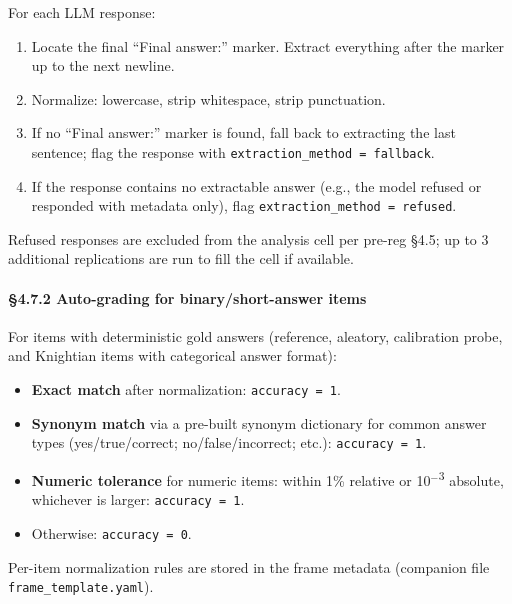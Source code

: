 \documentclass{article}
\providecommand{\tightlist}{\setlength{\itemsep}{0pt}\setlength{\parskip}{0pt}}
\begin{document}
For each LLM response:

\begin{enumerate}
\def\labelenumi{\arabic{enumi}.}
\tightlist
\item
  Locate the final ``Final answer:'' marker. Extract everything after
  the marker up to the next newline.
\item
  Normalize: lowercase, strip whitespace, strip punctuation.
\item
  If no ``Final answer:'' marker is found, fall back to extracting the
  last sentence; flag the response with
  \texttt{extraction\_method\textasciigrave{}\textasciigrave{}\ =\ fallback}.
\item
  If the response contains no extractable answer (e.g., the model
  refused or responded with metadata only), flag
  \texttt{extraction\_method\textasciigrave{}\textasciigrave{}\ =\ refused}.
\end{enumerate}

Refused responses are excluded from the analysis cell per pre-reg \S{}4.5;
up to 3 additional replications are run to fill the cell if available.

\paragraph{\S{}4.7.2 Auto-grading for binary/short-answer
items}\label{auto-grading-for-binaryshort-answer-items}

For items with deterministic gold answers (reference, aleatory,
calibration probe, and Knightian items with categorical answer format):

\begin{itemize}
\tightlist
\item
  \textbf{Exact match} after normalization: \texttt{accuracy\ =\ 1}.
\item
  \textbf{Synonym match} via a pre-built synonym dictionary for common
  answer types (yes/true/correct; no/false/incorrect; etc.):
  \texttt{accuracy\ =\ 1}.
\item
  \textbf{Numeric tolerance} for numeric items: within 1\% relative or
  10\ensuremath{^{-}}\textsuperscript{3} absolute, whichever is larger: \texttt{accuracy\ =\ 1}.
\item
  Otherwise: \texttt{accuracy\ =\ 0}.
\end{itemize}

Per-item normalization rules are stored in the frame metadata (companion
file \texttt{frame\_\textasciigrave{}\textasciigrave{}template.yaml}).
\end{document}
